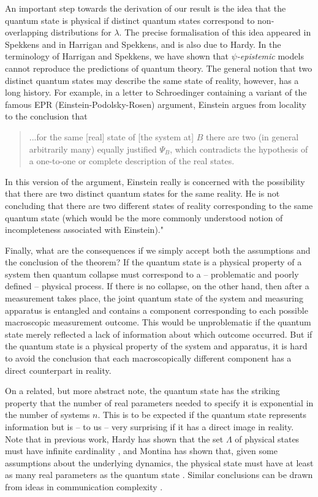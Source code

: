 \documentclass[amsmath,amssymb,superscriptaddress,twocolumn,pra]{revtex4-1}
\begin{document}
An important step towards the derivation of our result is the idea that the quantum state is physical if distinct quantum states correspond to non-overlapping distributions for $\lambda$. The precise formalisation of this idea appeared in Spekkens\cite{context} and in Harrigan and Spekkens\cite{nic}, and is also due to Hardy\cite{hpriv}. In the terminology of Harrigan and Spekkens, we have shown that \emph{$\psi$-epistemic} models cannot reproduce the predictions of quantum theory. The general notion that two distinct quantum states may describe the same state of reality, however, has a long history. For example, in a letter to Schroedinger containing a variant of the famous EPR (Einstein-Podolsky-Rosen) argument\cite{epr}, Einstein argues from locality to the conclusion that
\begin{quotation}
...for the same [real] state of [the system at] $B$ there are two (in general arbitrarily many) equally justified $\Psi_B$, which contradicts the hypothesis of a one-to-one or complete description of the real states. \cite{einquote}
\end{quotation}
In this version of the argument, Einstein really is concerned with the possibility that there are two distinct quantum states for the same reality. He is not concluding that there are two different states of reality corresponding to the same quantum state (which would be the more commonly understood notion of incompleteness associated with Einstein)."

Finally, what are the consequences if we simply accept both the assumptions and the conclusion of the theorem? If the quantum state is a physical property of a system then quantum collapse must correspond to a -- problematic and poorly defined -- physical process. If there is no collapse, on the other hand, then after a measurement takes place, the joint quantum state of the system and measuring apparatus is entangled and contains a component corresponding to each possible macroscopic measurement outcome. This would be unproblematic if the quantum state merely reflected a lack of information about which outcome occurred. But if the quantum state is a physical property of the system and apparatus, it is hard to avoid the conclusion that each macroscopically different component has a direct counterpart in reality.

On a related, but more abstract note, the quantum state has the striking property that the number of real parameters needed to specify it is exponential in the number of systems $n$. This is to be expected if the quantum state represents information but is -- to us -- very surprising if it has a direct image in reality. Note that in previous work, Hardy has shown that the set $\Lambda$ of physical states must have infinite cardinality \cite{baggage}, and Montina has shown that, given some assumptions about the underlying dynamics, the physical state must have at least as many real parameters as the quantum state \cite{montina2,montina}. Similar conclusions can be drawn from ideas in communication complexity \cite{complex}.  
\end{document}
